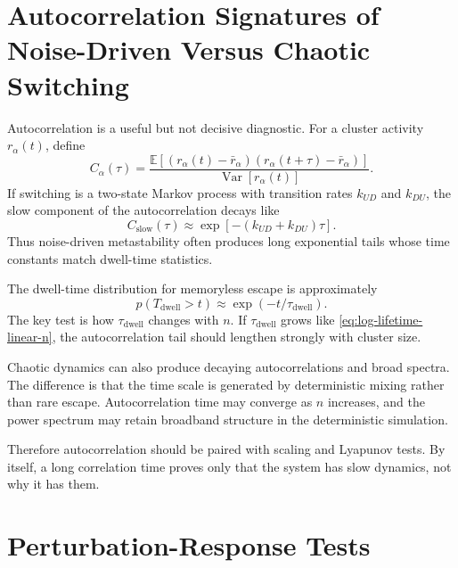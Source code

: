 \section{Autocorrelation Signatures of Noise-Driven Versus Chaotic Switching}
\label{sec:autocorrelation-signatures}

Autocorrelation is a useful but not decisive diagnostic. For a cluster activity $r_{\alpha}(t)$, define
%
\begin{equation}
  C_{\alpha}(\tau)
  =
  \frac{
    \mathbb{E}[(r_{\alpha}(t)-\bar r_{\alpha})(r_{\alpha}(t+\tau)-\bar r_{\alpha})]
  }{
    \operatorname{Var}[r_{\alpha}(t)]
  }.
  \label{eq:ch12-autocorrelation}
\end{equation}
%
If switching is a two-state Markov process with transition rates $k_{UD}$ and $k_{DU}$, the slow component of the autocorrelation decays like
%
\begin{equation}
  C_{\mathrm{slow}}(\tau)
  \approx
  \exp[-(k_{UD}+k_{DU})\tau].
  \label{eq:two-state-autocorrelation}
\end{equation}
%
Thus noise-driven metastability often produces long exponential tails whose time constants match dwell-time statistics.

The dwell-time distribution for memoryless escape is approximately
%
\begin{equation}
  p(T_{\mathrm{dwell}}>t)
  \approx
  \exp(-t/\tau_{\mathrm{dwell}}).
  \label{eq:exponential-dwell-survival}
\end{equation}
%
The key test is how $\tau_{\mathrm{dwell}}$ changes with $n$. If $\tau_{\mathrm{dwell}}$ grows like \eqref{eq:log-lifetime-linear-n}, the autocorrelation tail should lengthen strongly with cluster size.

Chaotic dynamics can also produce decaying autocorrelations and broad spectra. The difference is that the time scale is generated by deterministic mixing rather than rare escape. Autocorrelation time may converge as $n$ increases, and the power spectrum may retain broadband structure in the deterministic simulation.

Therefore autocorrelation should be paired with scaling and Lyapunov tests. By itself, a long correlation time proves only that the system has slow dynamics, not why it has them.

\section{Perturbation-Response Tests}
\label{sec:perturbation-response-tests}

